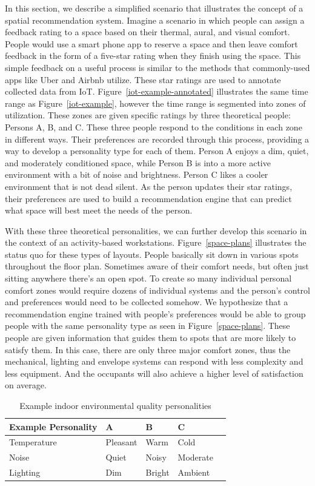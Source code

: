\documentclass[]{interact}
\theoremstyle{plain}%
\theoremstyle{definition}
\theoremstyle{remark}
\begin{document}
In this section, we describe a simplified scenario that illustrates the concept of a spatial recommendation system. Imagine a scenario in which people can assign a feedback rating to a space based on their thermal, aural, and visual comfort. People would use a smart phone app to reserve a space and then leave comfort feedback in the form of a five-star rating when they finish using the space. This simple feedback on a useful process is similar to the methods that commonly-used apps like Uber and Airbnb utilize. These star ratings are used to annotate collected data from IoT. Figure~\ref{iot-example-annotated} illustrates the same time range as Figure~\ref{iot-example}, however the time range is segmented into zones of utilization. These zones are given specific ratings by three theoretical people: Persons A, B, and C. These three people respond to the conditions in each zone in different ways. Their preferences are recorded through this process, providing a way to develop a personality type for each of them. Person A enjoys a dim, quiet, and moderately conditioned space, while Person B is into a more active environment with a bit of noise and brightness. Person C likes a cooler environment that is not dead silent. As the person updates their star ratings, their preferences are used to build a recommendation engine that can predict what space will best meet the needs of the person.

With these three theoretical personalities, we can further develop this scenario in the context of an activity-based workstations. Figure~\ref{space-plans} illustrates the status quo for these types of layouts. People basically sit down in various spots throughout the floor plan. Sometimes aware of their comfort needs, but often just sitting anywhere there’s an open spot. To create so many individual personal comfort zones would require dozens of individual systems and the person’s control and preferences would need to be collected somehow. We hypothesize that a recommendation engine trained with people’s preferences would be able to group people with the same personality type as seen in Figure~\ref{space-plans}. These people are given information that guides them to spots that are more likely to satisfy them. In this case, there are only three major comfort zones, thus the mechanical, lighting and envelope systems can respond with less complexity and less equipment. And the occupants will also achieve a higher level of satisfaction on average.

\begin{table}[]
\centering
\begin{tabular}{lllll}
Example Personality & A & B & C \\
\hline
Temperature & Pleasant & Warm & Cold \\
Noise & Quiet & Noisy & Moderate \\
Lighting & Dim & Bright & Ambient
\end{tabular}
\caption{Example indoor environmental quality personalities}
\label{personality-types}
\end{table}
\end{document}
